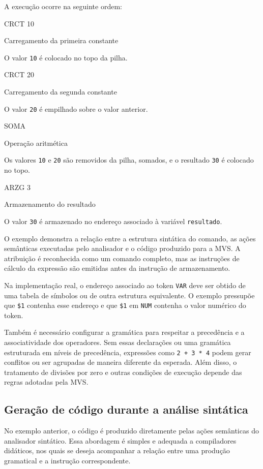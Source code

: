\documentclass[
  brazilian,
  letterpaper,
]{book}
\theoremstyle{plain}
\theoremstyle{definition}
\theoremstyle{remark}
\begin{document}
A execução ocorre na seguinte ordem:

CRCT 10

Carregamento da primeira constante

O valor \texttt{10} é colocado no topo da pilha.

CRCT 20

Carregamento da segunda constante

O valor \texttt{20} é empilhado sobre o valor anterior.

SOMA

Operação aritmética

Os valores \texttt{10} e \texttt{20} são removidos da pilha, somados, e
o resultado \texttt{30} é colocado no topo.

ARZG 3

Armazenamento do resultado

O valor \texttt{30} é armazenado no endereço associado à variável
\texttt{resultado}.

O exemplo demonstra a relação entre a estrutura sintática do comando, as
ações semânticas executadas pelo analisador e o código produzido para a
MVS. A atribuição é reconhecida como um comando completo, mas as
instruções de cálculo da expressão são emitidas antes da instrução de
armazenamento.

Na implementação real, o endereço associado ao token \texttt{VAR} deve
ser obtido de uma tabela de símbolos ou de outra estrutura equivalente.
O exemplo pressupõe que \texttt{\$1} contenha esse endereço e que
\texttt{\$1} em \texttt{NUM} contenha o valor numérico do token.

Também é necessário configurar a gramática para respeitar a precedência
e a associatividade dos operadores. Sem essas declarações ou uma
gramática estruturada em níveis de precedência, expressões como
\texttt{2\ +\ 3\ *\ 4} podem gerar conflitos ou ser agrupadas de maneira
diferente da esperada. Além disso, o tratamento de divisões por zero e
outras condições de execução depende das regras adotadas pela MVS.

\subsection{Geração de código durante a análise
sintática}\label{gerauxe7uxe3o-de-cuxf3digo-durante-a-anuxe1lise-sintuxe1tica}

No exemplo anterior, o código é produzido diretamente pelas ações
semânticas do analisador sintático. Essa abordagem é simples e adequada
a compiladores didáticos, nos quais se deseja acompanhar a relação entre
uma produção gramatical e a instrução correspondente.
\end{document}
